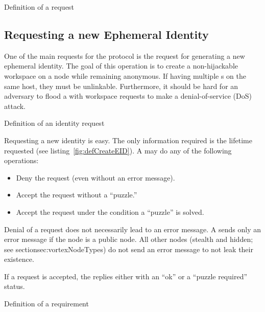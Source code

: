 \begin{lstfloat}[ht]
	
	\caption{Definition of a request}
	\label{fig:defReply}
\end{lstfloat}

\subsection{Requesting a new Ephemeral Identity\label{sec:newEID}}
One of the main requests for the protocol is the request for generating a new ephemeral identity. The goal of this operation is to create a non-hijackable workspace on a node while remaining anonymous. If having multiple s on the same host, they must be unlinkable. Furthermore, it should be hard for an adversary to flood a \VortexNode{} with workspace requests to make a denial-of-service (DoS) attack.

\begin{lstfloat}[ht]
	
	\caption{Definition of an identity request}
	\label{fig:defCreateEID}
\end{lstfloat}

Requesting a new identity is easy. The only information required is the lifetime requested (see listing~\ref{fig:defCreateEID}). A \VortexNode{} may do any of the following operations:
\begin{itemize}
	\item Deny the request (even without an error message).
	\item Accept the request without a ``puzzle.''
	\item Accept the request under the condition a ``puzzle'' is solved.
\end{itemize}

Denial of a request does not necessarily lead to an error message. A \VortexNode{} sends only an error message if the node is a public node. All other nodes (stealth and hidden; see section{sec:vortexNodeTypes}) do not send an error message to not leak their existence.

If a request is accepted, the \VortexNode{} replies either with an ``ok'' or a ``puzzle required'' status.

\begin{lstfloat}[ht]
	
	\caption{Definition of a requirement}
	\label{fig:defRequirements}
\end{lstfloat}

